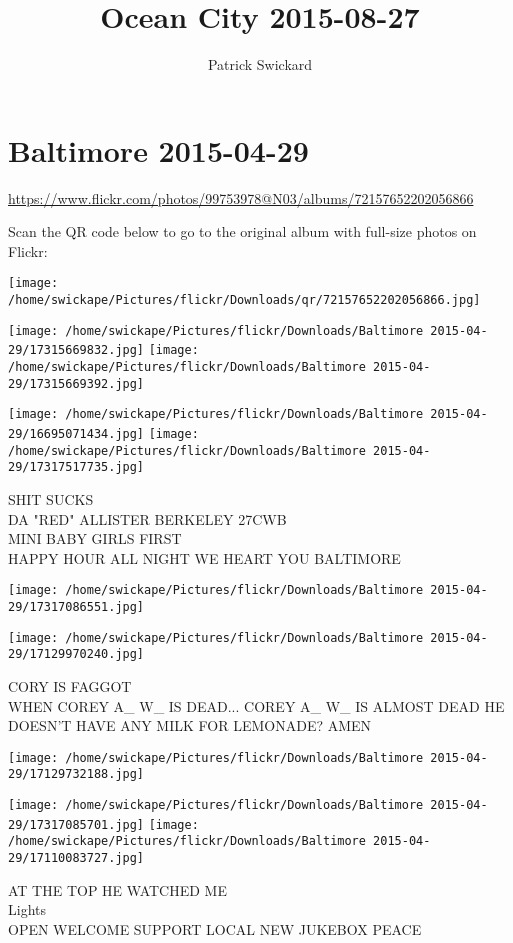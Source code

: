 \documentclass[10pt,letterpaper]{article}
\title{Ocean City 2015-08-27}
\author{Patrick Swickard}
\date{}
\begin{document}
\section*{Baltimore 2015-04-29}

\url{https://www.flickr.com/photos/99753978@N03/albums/72157652202056866}

Scan the QR code below to go to the original album with full-size photos on Flickr:

\texttt{[image: /home/swickape/Pictures/flickr/Downloads/qr/72157652202056866.jpg]}
\pagebreak

\texttt{[image: /home/swickape/Pictures/flickr/Downloads/Baltimore 2015-04-29/17315669832.jpg]}
\texttt{[image: /home/swickape/Pictures/flickr/Downloads/Baltimore 2015-04-29/17315669392.jpg]}

\texttt{[image: /home/swickape/Pictures/flickr/Downloads/Baltimore 2015-04-29/16695071434.jpg]}
\texttt{[image: /home/swickape/Pictures/flickr/Downloads/Baltimore 2015-04-29/17317517735.jpg]}

SHIT SUCKS\\
DA "RED" ALLISTER BERKELEY 27CWB\\
MINI BABY GIRLS FIRST\\
HAPPY HOUR ALL NIGHT WE HEART YOU BALTIMORE
\pagebreak

\texttt{[image: /home/swickape/Pictures/flickr/Downloads/Baltimore 2015-04-29/17317086551.jpg]}

\vspace{0.25in}
\texttt{[image: /home/swickape/Pictures/flickr/Downloads/Baltimore 2015-04-29/17129970240.jpg]}

CORY IS FAGGOT\\
WHEN COREY A\_ W\_ IS DEAD...  COREY A\_ W\_ IS ALMOST DEAD HE DOESN'T HAVE ANY MILK FOR LEMONADE?  AMEN
\pagebreak

\texttt{[image: /home/swickape/Pictures/flickr/Downloads/Baltimore 2015-04-29/17129732188.jpg]}

\vspace{0.25in}
\texttt{[image: /home/swickape/Pictures/flickr/Downloads/Baltimore 2015-04-29/17317085701.jpg]}
\texttt{[image: /home/swickape/Pictures/flickr/Downloads/Baltimore 2015-04-29/17110083727.jpg]}

AT THE TOP HE WATCHED ME\\
Lights\\
OPEN WELCOME SUPPORT LOCAL NEW JUKEBOX PEACE
\pagebreak
\end{document}
